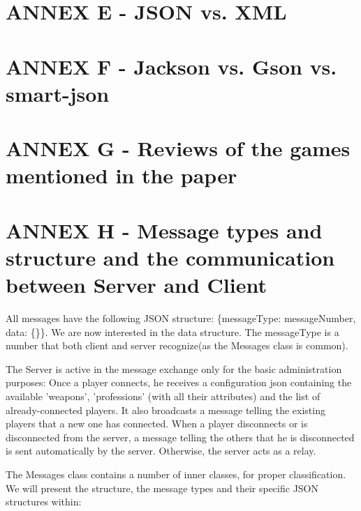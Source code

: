 \documentclass{article}
\begin{document}
\section{ANNEX E - JSON vs. XML}

\section{ANNEX F - Jackson vs. Gson vs. smart-json}

\section{ANNEX G - Reviews of the games mentioned in the paper}

\section{ANNEX H - Message types and structure and the communication between
Server and Client}

All messages have the following JSON structure: \{messageType: messageNumber,
data: \{\}\}. We are now interested in the data structure. The messageType is a
number that both client and server recognize(as the Messages class is
common).\newline

The Server is active in the message exchange only for the basic administration
purposes: Once a player connects, he receives a configuration json containing
the available 'weapons', 'professions' (with all their attributes) and the list
of already-connected players. It also broadcasts a message telling the existing
players that a new one has connected. When a player disconnects or is
disconnected from the server, a message telling the others that he is
disconnected is sent automatically by the server. Otherwise, the server acts as
a relay.\newline

The Messages class contains a number of inner classes, for proper
classification. We will present the structure, the message types and their
specific JSON structures within:
\end{document}

